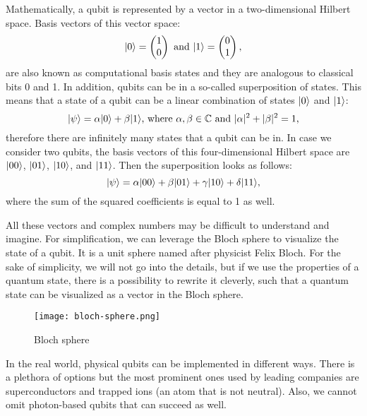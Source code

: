 Mathematically, a qubit is represented by a vector in a two-dimensional Hilbert space. Basis vectors of this vector space:
\begin{equation}
\lvert0\rangle = \begin{pmatrix} 1 \\ 0 \end{pmatrix}\text{ and }\lvert1\rangle = \begin{pmatrix} 0 \\ 1 \end{pmatrix},
\end{equation}
are also known as computational basis states and they are analogous to classical bits 0 and 1. In addition, qubits can be in a so-called superposition of states. This means that a state of a qubit can be a linear combination of states $\lvert0\rangle$ and $\lvert1\rangle$:
\begin{equation}
\lvert\psi\rangle = \alpha \lvert0\rangle + \beta \lvert1\rangle\text{, where } \alpha,\beta \in \mathbb{C}\text{ and } \lvert \alpha \rvert^2 + \lvert \beta \rvert^2 = 1\text{,}
\end{equation}
therefore there are infinitely many states that a qubit can be in. In case we consider two qubits, the basis vectors of this four-dimensional Hilbert space are $\lvert00\rangle$, $\lvert01\rangle$, $\lvert10\rangle$, and $\lvert11\rangle$. Then the superposition looks as follows:
\begin{equation}
 \lvert\psi\rangle = \alpha \lvert00\rangle + \beta \lvert01\rangle + \gamma \lvert10\rangle + \delta \lvert11\rangle\text{,}
\end{equation}
where the sum of the squared coefficients is equal to 1 as well. 

All these vectors and complex numbers may be difficult to understand and imagine. For simplification, we can leverage the Bloch sphere to visualize the state of a qubit. It is a unit sphere named after physicist Felix Bloch. For the sake of simplicity, we will not go into the details, but if we use the properties of a quantum state, there is a possibility to rewrite it cleverly, such that a quantum state can be visualized as a vector in the Bloch sphere.

\begin{figure}[H]
    \begin{center}
       \texttt{[image: bloch-sphere.png]}
       \caption{Bloch sphere \cite{img:bloch_sphere}}
    \end{center}
\end{figure} 

In the real world, physical qubits can be implemented in different ways. There is a plethora of options but the most prominent ones used by leading companies are superconductors and trapped ions (an atom that is not neutral). Also, we cannot omit photon-based qubits that can succeed as well.  


